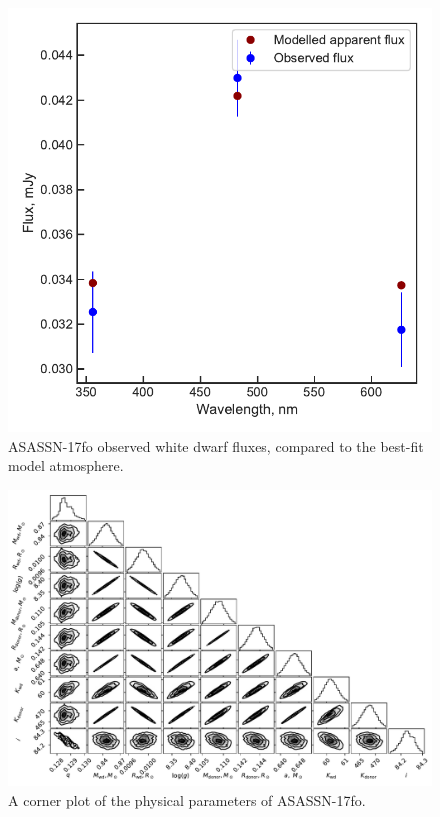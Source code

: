 \begin{figure}
    \centering
    \includegraphics[width=\textwidth]{figures/results/ASASSN-17fo/fluxplot.pdf}
    \caption{ASASSN-17fo observed white dwarf fluxes, compared to the best-fit model atmosphere.}
    \label{fig:ASASSN-17fo flux plot}
\end{figure}
\begin{figure}
    \includegraphics[height=\textwidth, angle=90]{figures/results/physicalparams_corners/ASASSN-17fo_physcorner.pdf}
    \caption{A corner plot of the physical parameters of ASASSN-17fo.}
\end{figure}
\clearpage




